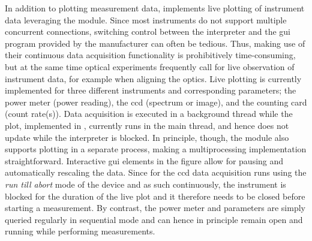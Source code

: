 In addition to plotting measurement data, \mjolnir implements live plotting of instrument data leveraging the  module.
Since most instruments do not support multiple concurrent connections, switching control between the \python interpreter and the \gls{gui} program provided by the manufacturer can often be tedious.
Thus, making use of their continuous data acquisition functionality is prohibitively time-consuming, but at the same time optical experiments frequently call for live observation of instrument data, for example when aligning the optics.
Live plotting is currently implemented for three different instruments and corresponding parameters; the \thorlabspowermeter power meter (power reading), the \theccd \gls{ccd} (spectrum or image), and the \tagger counting card (count rate(s)).
Data acquisition is executed in a background thread while the plot, implemented in \matplotlib, currently runs in the main thread, and hence does not update while the interpreter is blocked.
In principle, though, the  module also supports plotting in a separate process, making a multiprocessing implementation straightforward.
Interactive \gls{gui} elements in the \matplotlib figure allow for pausing and automatically rescaling the data.
Since for the \gls{ccd} data acquisition runs using the \emph{run till abort} mode of the device and as such continuously, the instrument is blocked for the duration of the live plot and it therefore needs to be closed before starting a measurement.
By contrast, the power meter and \taggershort parameters are simply queried regularly in sequential mode and can hence in principle remain open and running while performing measurements.
